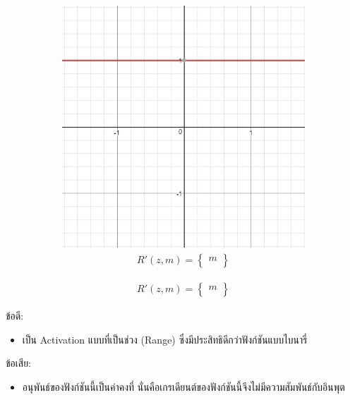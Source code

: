 \begin{itemize}
\begin{figure}[htbp]
\begin{subfigure}{0.5\textwidth}
            \includegraphics[width=0.9\linewidth]{fig/actfunc_linear_der.png}
            \caption{%
                \begin{equation}
                    \begin{split}R'(z,m) = \begin{Bmatrix} m \\
                    \end{Bmatrix}\end{split}
                \end{equation}
            }
            \label{fig:actfunc_lin_der}
        \end{subfigure}
    \end{figure}
    ข้อดี:
    \begin{itemize}
        \item เป็น Activation แบบที่เป็นช่วง (Range) ซึ่งมีประสิทธิดีกว่าฟังก์ชันแบบไบนารี่
    \end{itemize}
    ข้อเสีย:
    \begin{itemize}
        \item อนุพันธ์ของฟังก์ชันนี้เป็นค่าคงที่ นั่นคือเกรเดียนต์ของฟังก์ชันนี้จึงไม่มีความสัมพันธ์กับอินพุต
    \end{itemize}


\end{itemize}
